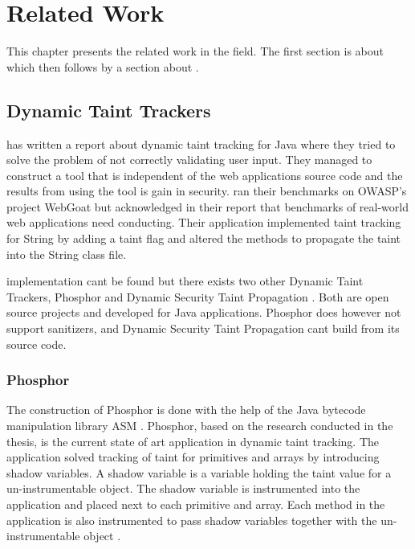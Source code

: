 \chapter{Related Work}

This chapter presents the related work in the field. The first section is about \textit{} which then follows by a section about \textit{}.



\section{Dynamic Taint Trackers}
\label{RW:DynamicTaintTracking}
\textcite{Haldar} has written a report about dynamic taint tracking for Java where they tried to solve the problem of not correctly validating user input. They managed to construct a tool that is independent of the web applications source code and the results from using the tool is gain in security. \textcite{Haldar} ran their benchmarks on OWASP’s project WebGoat \parencite{webgoat} but acknowledged in their report that benchmarks of real-world web applications need conducting. Their application implemented taint tracking for String by adding a taint flag and altered the methods to propagate the taint into the String class file.

\textcite{Haldar} implementation cant be found but there exists two other Dynamic Taint Trackers, Phosphor \parencite{phosphor} and Dynamic Security Taint Propagation \parencite{securityTaint}. Both are open source projects and developed for Java applications. Phosphor does however not support sanitizers, and Dynamic Security Taint Propagation cant build from its source code.



\subsection{Phosphor}
The construction of Phosphor \parencite{phosphor} is done with the help of the Java bytecode manipulation library ASM \parencite{asm}. Phosphor, based on the research conducted in the thesis, is the current state of art application in dynamic taint tracking. The application solved tracking of taint for primitives and arrays by introducing shadow variables. A shadow variable is a variable holding the taint value for a un-instrumentable object. The shadow variable is instrumented into the application and placed next to each primitive and array. Each method in the application is also instrumented to pass shadow variables together with the un-instrumentable object \parencite{BellJ.2014PIdd}.



